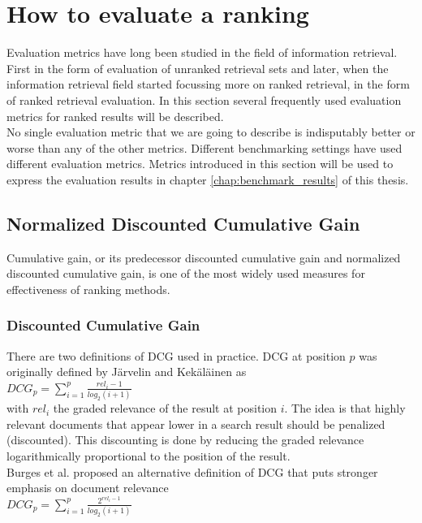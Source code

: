 \section{How to evaluate a ranking}
Evaluation metrics have long been studied in the field of information retrieval. First in the form of evaluation of unranked retrieval sets and later, when the information retrieval field started focussing more on ranked retrieval, in the form of ranked retrieval evaluation. In this section several frequently used evaluation metrics for ranked results will be described.\\

No single evaluation metric that we are going to describe is indisputably better or worse than any of the other metrics. Different benchmarking settings have used different evaluation metrics. Metrics introduced in this section will be used to express the evaluation results in chapter \ref{chap:benchmark_results} of this thesis.
\subsection{Normalized Discounted Cumulative Gain}
Cumulative gain, or its predecessor discounted cumulative gain and normalized discounted cumulative gain, is one of the most widely used measures for effectiveness of ranking methods.
\subsubsection{Discounted Cumulative Gain}
There are two definitions of \ac{DCG} used in practice. \ac{DCG} at position $p$ was originally defined by J{\"a}rvelin and Kek{\"a}l{\"a}inen \cite{Jarvelin2002} as\\

$DCG_p = \sum\nolimits_{i=1}^p \frac{rel_i-1}{log_2(i+1)}$\\

with $rel_i$ the graded relevance of the result at position $i$. The idea is that highly relevant documents that appear lower in a search result should be penalized (discounted). This discounting is done by reducing the graded relevance  logarithmically proportional to the position of the result.\\

Burges et al. \cite{Burges2005} proposed an alternative definition of \ac{DCG} that puts stronger emphasis on document relevance\\

$DCG_p = \sum\nolimits_{i=1}^p \frac{2^{rel_i-1}}{log_2(i+1)}$\\


